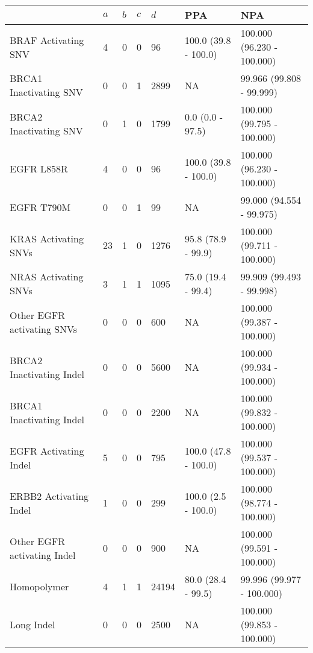 \begin{tabular}{|l|l|l|l|l|l|l|}
\hline
\rowcolor[gray]{.85}{}                           & \textbf{$a$} & \textbf{$b$} & \textbf{$c$} & \textbf{$d$} & \textbf{PPA} & \textbf{                         NPA }\\ \hline
BRAF Activating SNV         &    4 &    0 &    0 &     96 &  100.0 (39.8 - 100.0) &  100.000 (96.230 - 100.000) \\ \hline
BRCA1 Inactivating SNV      &    0 &    0 &    1 &   2899 &                    NA &    99.966 (99.808 - 99.999) \\ \hline
BRCA2 Inactivating SNV      &    0 &    1 &    0 &   1799 &      0.0 (0.0 - 97.5) &  100.000 (99.795 - 100.000) \\ \hline
EGFR L858R                  &    4 &    0 &    0 &     96 &  100.0 (39.8 - 100.0) &  100.000 (96.230 - 100.000) \\ \hline
EGFR T790M                  &    0 &    0 &    1 &     99 &                    NA &    99.000 (94.554 - 99.975) \\ \hline
KRAS Activating SNVs        &   23 &    1 &    0 &   1276 &    95.8 (78.9 - 99.9) &  100.000 (99.711 - 100.000) \\ \hline
NRAS Activating SNVs        &    3 &    1 &    1 &   1095 &    75.0 (19.4 - 99.4) &    99.909 (99.493 - 99.998) \\ \hline
Other EGFR activating SNVs  &    0 &    0 &    0 &    600 &                    NA &  100.000 (99.387 - 100.000) \\ \hline
BRCA2 Inactivating Indel    &    0 &    0 &    0 &   5600 &                    NA &  100.000 (99.934 - 100.000) \\ \hline
BRCA1 Inactivating Indel    &    0 &    0 &    0 &   2200 &                    NA &  100.000 (99.832 - 100.000) \\ \hline
EGFR Activating Indel       &    5 &    0 &    0 &    795 &  100.0 (47.8 - 100.0) &  100.000 (99.537 - 100.000) \\ \hline
ERBB2 Activating Indel      &    1 &    0 &    0 &    299 &   100.0 (2.5 - 100.0) &  100.000 (98.774 - 100.000) \\ \hline
Other EGFR activating Indel &    0 &    0 &    0 &    900 &                    NA &  100.000 (99.591 - 100.000) \\ \hline
Homopolymer                 &    4 &    1 &    1 &  24194 &    80.0 (28.4 - 99.5) &   99.996 (99.977 - 100.000) \\ \hline
Long Indel                  &    0 &    0 &    0 &   2500 &                    NA &  100.000 (99.853 - 100.000) \\ \hline

\end{tabular}
